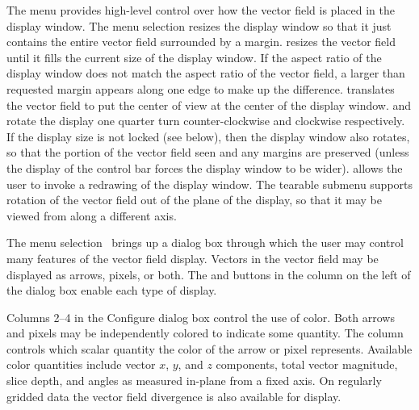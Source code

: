 The  menu provides high-level control over how the vector
field is placed in the display window.  The menu selection
{} resizes the display window so that it
just contains the entire vector field surrounded by a margin.
{} resizes the vector field until it fills
the current size of the display window.  If the aspect ratio of the
display window does not match the aspect ratio of the vector field, a
larger than requested margin appears along one edge to make up the
difference.  {} translates the vector
field to put the center of view at the center of the display window.
{} and {} rotate the
display one quarter turn counter-clockwise and clockwise respectively.
If the display size is not locked (see {}
below), then the display window also rotates, so that the portion of the
vector field seen and any margins are preserved (unless the display of
the control bar forces the display window to be wider).  {} allows the user to invoke a redrawing of the display window.
The {} tearable submenu supports rotation of
the vector field out of the plane of the display, so that it may be
viewed from along a different axis.

The menu selection \ brings up a
dialog box through which the user may control many features of the
vector field display.  Vectors in the vector field may be displayed as
arrows, pixels, or both.  The  and  buttons in the
 column on the left of the dialog box enable each type of
display.

Columns 2--4 in the Configure dialog box control the use of color.  Both
arrows and pixels may be independently colored to indicate some
quantity.  The  column
controls which scalar quantity the color of the arrow or pixel
represents.  Available color quantities include vector $x$, $y$, and $z$
components, total vector magnitude, slice depth, and angles as measured
in-plane from a fixed axis.  On regularly gridded data the vector field
divergence is also available for display.


